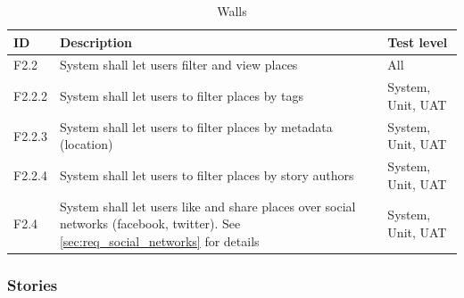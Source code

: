 \documentclass[11pt]{book}
\begin{document}
\begin{table}[H]
\centering
\begin{tabular}{ l  p{11cm} l }
    ID       & Description                                                                                              & Test level            \\ \hline
    F2.2     & System shall let users filter and view places                                                            & All                   \\ \hline
    F2.2.2   & System shall let users to filter places by tags                                                          & System, Unit, UAT     \\ \hline
    F2.2.3   & System shall let users to filter places by metadata (location)                                           & System, Unit, UAT     \\ \hline
    F2.2.4   & System shall let users to filter places by story authors                                                 & System, Unit, UAT     \\ \hline
    F2.4     & System shall let users like and share places over social networks (facebook, twitter). 
               See \ref{sec:req_social_networks} for details                                                            & System, Unit, UAT     \\ 
\end{tabular}
\caption{Walls}
\label{tab:req_walls}
\end{table}

\subsubsection{Stories}
\end{document}
